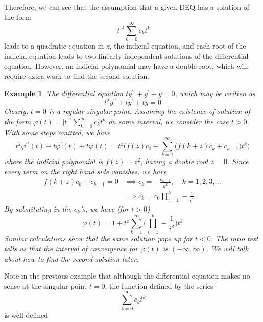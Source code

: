 \documentclass{article}
\newtheorem{example}{Example}[section]
\theoremstyle{remark}
\theoremstyle{definition}
\begin{document}
Therefore, we can see that the assumption that a given DEQ has a solution of the form 
\[|t|^z \sum_{k=0}^\infty c_k t^k\]
leads to a quadratic equation in $z$, the indicial equation, and each root of the indicial equation leads to two linearly independent solutions of the differential equation. However, an indicial polynomial may have a double root, which will require extra work to find the second solution. 

\begin{example}
The differential equation $t y^{\prime\prime} + y^\prime + y = 0$, which may be written as 
\[t^2 y^{\prime\prime} + t y^\prime + ty = 0\]
Clearly, $t=0$ is a regular singular point. Assuming the existence of solution of the form $\varphi(t) = |t|^z \sum_{k=0}^\infty c_k t^k$ on some interval, we consider the case $t>0$. With some steps omitted, we have
\[t^2 \varphi^{\prime\prime} (t) + t \varphi^\prime (t) + t \varphi(t) = t^z \bigg( f(z) c_0 + \sum_{k=1}^\infty \big( f(k+z) c_k + c_{k-1} \big) t^k \bigg)\]
where the indicial polynomial is $f(z) = z^2$, having a double root $z=0$. Since every term on the right hand side vanishes, we have
\begin{align*}
    f(k+z) c_k + c_{k-1} = 0 & \implies c_k = -\frac{c_{k-1}}{k^2}, \;\;\;\; k = 1, 2, 3, \ldots \\
    & \implies c_k = c_0 \prod_{i=1}^k -\frac{1}{i^2}
\end{align*}
By substituting in the $c_k$'s, we have (for $t>0$)
\[\varphi(t) = 1 + t^z \sum_{k=1}^\infty \bigg(\prod_{i=1}^k -\frac{1}{i^2}\bigg) t^k\]
Similar calculations show that the same solution pops up for $t<0$. The ratio test tells us that the interval of convergence for $\varphi(t)$ is $(-\infty, \infty)$. We will talk about how to find the second solution later. 
\end{example}

Note in the previous example that although the differential equation makes no sense at the singular point $t = 0$, the function defined by the series 
\[\sum_{k=0}^\infty c_k t^k\]
is well defined 
\end{document}
